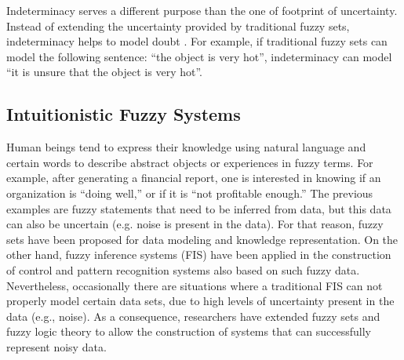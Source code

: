 Indeterminacy serves a different purpose than the one of footprint of
uncertainty. Instead of extending the uncertainty provided by traditional fuzzy
sets, indeterminacy helps to model doubt \cite{Xu2007}. For example, if
traditional fuzzy sets can model the following sentence: ``the object is very
hot'', indeterminacy can model ``it is unsure that the object is very hot''.

\subsection{Intuitionistic Fuzzy Systems}
\label{subsection:intuitionistic-fuzzy-systems}

Human beings tend to express their knowledge using natural language and certain
words to describe abstract objects or experiences in fuzzy terms. For example,
after generating a financial report, one is interested in knowing if an
organization is ``doing well,'' or if it is ``not profitable enough.'' The
previous examples are fuzzy statements that need to be inferred from data, but
this data can also be uncertain (e.g. noise is present in the data). For that
reason, fuzzy sets have been proposed for data modeling and knowledge
representation. On the other hand, fuzzy inference systems (FIS) have been
applied in the construction of control and pattern recognition systems also
based on such fuzzy data. Nevertheless, occasionally there are situations where
a traditional FIS can not properly model certain data sets, due to high levels
of uncertainty present in the data (e.g., noise). As a consequence, researchers
have extended fuzzy sets and fuzzy logic theory to allow the construction of
systems that can successfully represent noisy data.

